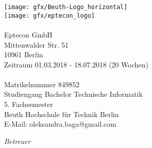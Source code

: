 \begin{titlepage}
	\tgherosfont
	\centering

	\texttt{[image: gfx/Beuth-Logo\_horizontal]} \\[12mm]
	\texttt{[image: gfx/eptecon\_logo]} \\[0mm]
	\textsf{\thesisUniversityDepartment} \\
    {\normalsize Eptecon GmbH}\\
    {\normalsize Mittenwalder Str. 51 }\\
    {\normalsize 10961 Berlin}\\[5mm]
    {\small{Zeitraum 01.03.2018 - 18.07.2018 (20 Wochen)}}
	\vfill
	{\LARGE \color{ctcolortitle}\textbf{\thesisTitle}}\\[10mm]
	
	{\LARGE \thesisName} \\[5mm]
    {\normalsize Matrikelnummer 849852} \\
	{\normalsize Studiengang Bachelor Technische Informatik} \\
    {\normalsize 5. Fachsemester} \\
    {\normalsize Beuth Hochschule für Technik Berlin} \\[5mm]
	{\small E-Mail: oleksandra.baga@gmail.com} \\

	\vfill
	\begin{minipage}[t]{.27\textwidth}
		\raggedleft
		\textit{Betreuer}
	\end{minipage}
	\hspace*{15pt}
	\begin{minipage}[t]{.65\textwidth}
		{\large \thesisFirstReviewer} \\
	  	{\small \thesisFirstReviewerDepartment} \\[-1mm]
		{\small \thesisFirstReviewerUniversity}
	\end{minipage} \\[5mm]
	\begin{minipage}[t]{.27\textwidth}
		\raggedleft
		\textit{ }
	\end{minipage}
	\hspace*{15pt}
	\begin{minipage}[t]{.65\textwidth}
		{\large \thesisSecondReviewer} \\
	  	{\small \thesisSecondReviewerDepartment} \\[-1mm]
		{\small \thesisSecondReviewerUniversity}
	\end{minipage} \\[10mm]
	\thesisDate \\
\end{titlepage}